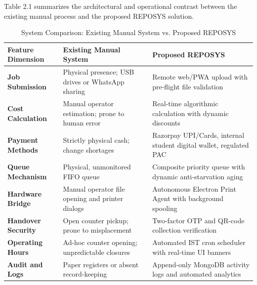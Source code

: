 \documentclass[12pt,a4paper,oneside]{report}
\begin{document}
Table 2.1 summarizes the architectural and operational contrast between the existing manual process and the proposed REPOSYS solution.

\begin{table}[H]
\centering
\small
\begin{tabularx}{\textwidth}{|p{1.3in}|X|X|}
\hline
\textbf{Feature Dimension} & \textbf{Existing Manual System} & \textbf{Proposed REPOSYS} \\ \hline
\textbf{Job Submission} & Physical presence; USB drives or WhatsApp sharing & Remote web/PWA upload with pre-flight file validation \\ \hline
\textbf{Cost Calculation} & Manual operator estimation; prone to human error & Real-time algorithmic calculation with dynamic discounts \\ \hline
\textbf{Payment Methods} & Strictly physical cash; change shortages & Razorpay UPI/Cards, internal student digital wallet, regulated PAC \\ \hline
\textbf{Queue Mechanism} & Physical, unmonitored FIFO queue & Composite priority queue with dynamic anti-starvation aging \\ \hline
\textbf{Hardware Bridge} & Manual operator file opening and printer dialogs & Autonomous Electron Print Agent with background spooling \\ \hline
\textbf{Handover Security} & Open counter pickup; prone to misplacement & Two-factor OTP and QR-code collection verification \\ \hline
\textbf{Operating Hours} & Ad-hoc counter opening; unpredictable closures & Automated IST cron scheduler with real-time UI banners \\ \hline
\textbf{Audit and Logs} & Paper registers or absent record-keeping & Append-only MongoDB activity logs and automated analytics \\ \hline
\end{tabularx}
\caption{System Comparison: Existing Manual System vs. Proposed REPOSYS}
\label{tab:comparison}
\end{table}
\end{document}
